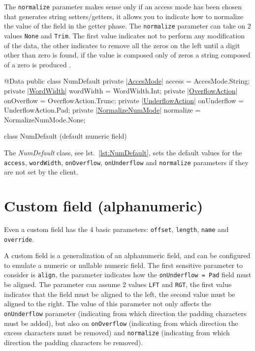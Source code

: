 The \verb!normalize! parameter makes sense only if an access mode has been 
chosen that generates string setters/getters, it allows you to indicate how to 
normalize the value of the field in the getter phase. 
The \verb!normalize! parameter can take on 2 values \verb!None! and \verb!Trim!. 
The first value indicates not to perform any modification of the data, the 
other indicates to remove all the zeros on the left until a digit other than 
zero is found, if the value is composed only of zeros a string composed of a 
zero is produced .

\begin{elisting}[!htb]
\begin{javacode}
@Data
public class NumDefault {
    private |\hyperref[lst:AccesMode]{AccesMode}| access = AccesMode.String;
    private |\hyperref[lst:WordWidth]{WordWidth}| wordWidth = WordWidth.Int;
    private |\hyperref[lst:OverflowAction]{OverflowAction}| onOverflow = OverflowAction.Trunc;
    private |\hyperref[lst:UnderflowAction]{UnderflowAction}| onUnderflow = UnderflowAction.Pad;
    private |\hyperref[lst:NormalizeNumMode]{NormalizeNumMode}| normalize = NormalizeNumMode.None;
}
\end{javacode}
\caption{class NumDefault (default numeric field)}
\label{lst:NumDefault}
\end{elisting}

The \textsl{NumDefault} class, see lst.~\ref{lst:NumDefault}, sets the default 
values for the \verb!access!, \verb!wordWidth!, \verb!onOverflow!, 
\texttt{onUnder\-flow} and \verb!normalize! parameters if they are not set by the 
client.

\section{Custom field (alphanumeric)}
Even a custom field has the 4 basic parameters: \verb!offset!, \verb!length!,
\verb!name! and \verb!override!.

A custom field is a generalization of an alphanumeric field, and can be 
configured to emulate a numeric or nullable numeric field. 
The first sensitive parameter to consider is \verb!align!, the parameter 
indicates how the \texttt{onUnderflow = Pad} field must be aligned. 
The parameter can assume 2 values \verb!LFT! and \verb!RGT!, the first value 
indicates that the field must be aligned to the left, the second value must be 
aligned to the right.
The value of this parameter not only affects the \verb!onUnderflow! parameter 
(indicating from which direction the padding characters must be added), but 
also on \verb!onOverflow! (indicating from which direction the excess characters 
must be removed) and \verb!normalize! (indicating from which direction the 
padding characters be removed).

